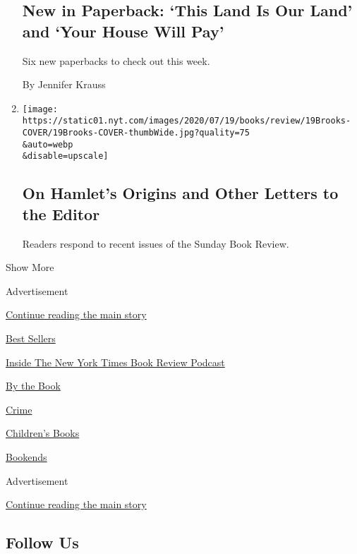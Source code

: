 \begin{enumerate}
  \hypertarget{new-in-paperback-this-land-is-our-land-and-your-house-will-pay}{%
  \subsection{New in Paperback: `This Land Is Our Land' and `Your House
  Will
  Pay'}\label{new-in-paperback-this-land-is-our-land-and-your-house-will-pay}}

  Six new paperbacks to check out this week.

  By Jennifer Krauss
\item
  \href{/2020/07/31/books/review/on-hamlets-origins-and-other-letters-to-the-editor.html}{}

  \texttt{[image: https://static01.nyt.com/images/2020/07/19/books/review/19Brooks-COVER/19Brooks-COVER-thumbWide.jpg?quality=75\\\&auto=webp\\\&disable=upscale]}

  \hypertarget{on-hamlets-origins-and-other-letters-to-the-editor}{%
  \subsection{On Hamlet's Origins and Other Letters to the
  Editor}\label{on-hamlets-origins-and-other-letters-to-the-editor}}

  Readers respond to recent issues of the Sunday Book Review.
\end{enumerate}

Show More

Advertisement

\protect\hyperlink{after-mid2}{Continue reading the main story}

\href{https://www.nytimes.com/best-sellers-books/overview.html}{Best
Sellers}

\href{https://www.nytimes.com/column/book-review-podcast}{Inside The New
York Times Book Review Podcast}

\href{https://www.nytimes.com/column/by-the-book}{By the Book}

\href{https://www.nytimes.com/column/crime}{Crime}

\href{https://www.nytimes.com/column/childrens-books}{Children's Books}

\href{https://www.nytimes.com/column/bookends}{Bookends}

Advertisement

\protect\hyperlink{after-mktg}{Continue reading the main story}

\hypertarget{follow-us}{%
\subsection{Follow Us}\label{follow-us}}

